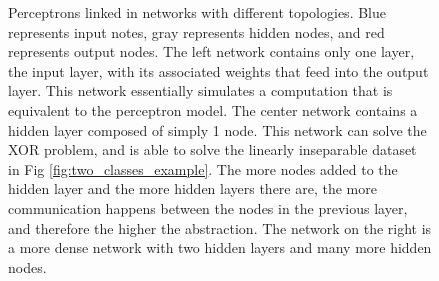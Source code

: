 \begin{figure}[!h]
\begin{subfigure}{0.30\linewidth}
  \end{subfigure}  
  \begin{subfigure}{0.40\linewidth}
    \centering
  \end{subfigure}
  \caption{Perceptrons linked in networks with different topologies. Blue represents input notes, gray represents hidden nodes, and red represents output nodes. The left network contains only one layer, the input layer, with its associated weights that feed into the output layer. This network essentially simulates a computation that is equivalent to the perceptron model. The center network contains a hidden layer composed of simply 1 node. This network can solve the XOR problem, and is able to solve the linearly inseparable dataset in Fig \ref{fig:two_classes_example}. The more nodes added to the hidden layer and the more hidden layers there are, the more communication happens between the nodes in the previous layer, and therefore the higher the abstraction. The network on the right is a more dense network with two hidden layers and many more hidden nodes.}
  \label{fig:perceptron_layers_example}
\end{figure}

